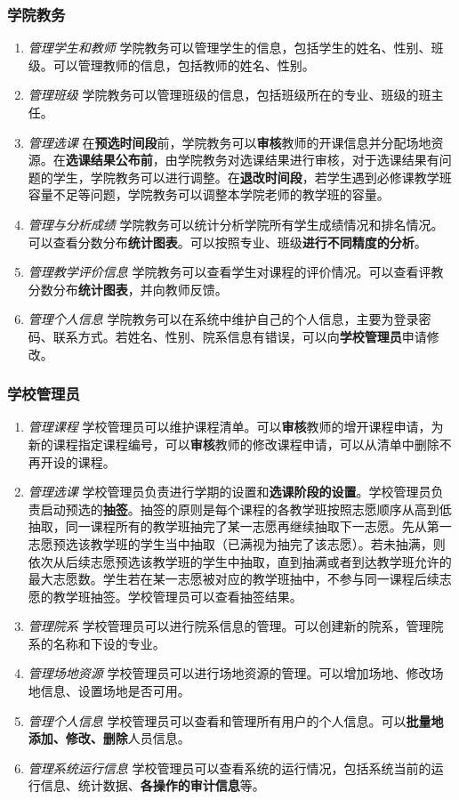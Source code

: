 \subsubsection{学院教务}
\begin{enumerate}
    \item \textit{管理学生和教师} \quad 学院教务可以管理学生的信息，包括学生的姓名、性别、班级。可以管理教师的信息，包括教师的姓名、性别。
    \item \textit{管理班级} \quad 学院教务可以管理班级的信息，包括班级所在的专业、班级的班主任。
    \item \textit{管理选课} \quad 在\textbf{预选时间段}前，学院教务可以\textbf{审核}教师的开课信息并分配场地资源。在\textbf{选课结果公布前}，由学院教务对选课结果进行审核，对于选课结果有问题的学生，学院教务可以进行调整。在\textbf{退改时间段}，若学生遇到必修课教学班容量不足等问题，学院教务可以调整本学院老师的教学班的容量。
    \item \textit{管理与分析成绩} \quad 学院教务可以统计分析学院所有学生成绩情况和排名情况。可以查看分数分布\textbf{统计图表}。可以按照专业、班级\textbf{进行不同精度的分析}。
    \item \textit{管理教学评价信息} \quad 学院教务可以查看学生对课程的评价情况。可以查看评教分数分布\textbf{统计图表}，并向教师反馈。
    \item \textit{管理个人信息} \quad 学院教务可以在系统中维护自己的个人信息，主要为登录密码、联系方式。若姓名、性别、院系信息有错误，可以向\textbf{学校管理员}申请修改。
\end{enumerate}

\subsubsection{学校管理员}
\begin{enumerate}
    \item \textit{管理课程} \quad 学校管理员可以维护课程清单。可以\textbf{审核}教师的增开课程申请，为新的课程指定课程编号，可以\textbf{审核}教师的修改课程申请，可以从清单中删除不再开设的课程。
    \item \textit{管理选课} \quad 学校管理员负责进行学期的设置和\textbf{选课阶段的设置}。学校管理员负责启动预选的\textbf{抽签}。抽签的原则是每个课程的各教学班按照志愿顺序从高到低抽取，同一课程所有的教学班抽完了某一志愿再继续抽取下一志愿。先从第一志愿预选该教学班的学生当中抽取（已满视为抽完了该志愿）。若未抽满，则依次从后续志愿预选该教学班的学生中抽取，直到抽满或者到达教学班允许的最大志愿数。学生若在某一志愿被对应的教学班抽中，不参与同一课程后续志愿的教学班抽签。学校管理员可以查看抽签结果。
    \item \textit{管理院系} \quad 学校管理员可以进行院系信息的管理。可以创建新的院系，管理院系的名称和下设的专业。
    \item \textit{管理场地资源} \quad 学校管理员可以进行场地资源的管理。可以增加场地、修改场地信息、设置场地是否可用。
    \item \textit{管理个人信息} \quad 学校管理员可以查看和管理所有用户的个人信息。可以\textbf{批量地添加、修改、删除}人员信息。
    \item \textit{管理系统运行信息} \quad 学校管理员可以查看系统的运行情况，包括系统当前的运行信息、统计数据、\textbf{各操作的审计信息}等。
\end{enumerate}
